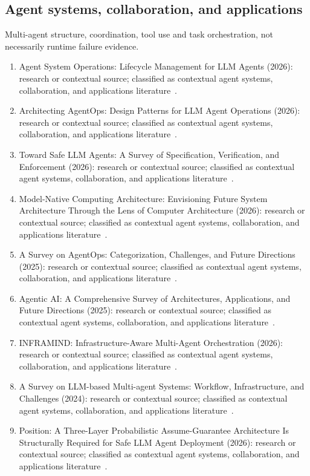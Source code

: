 \subsection{Agent systems, collaboration, and applications}
Multi-agent structure, coordination, tool use and task orchestration, not necessarily runtime failure evidence.
\begin{enumerate}
\setlength{\itemsep}{1pt}\setlength{\parskip}{0pt}
\footnotesize
\item Agent System Operations: Lifecycle Management for {LLM} Agents (2026): research or contextual source; classified as contextual agent systems, collaboration, and applications literature~\cite{ext012}.
\item Architecting {AgentOps}: Design Patterns for {LLM} Agent Operations (2026): research or contextual source; classified as contextual agent systems, collaboration, and applications literature~\cite{ext013}.
\item Toward Safe {LLM} Agents: A Survey of Specification, Verification, and Enforcement (2026): research or contextual source; classified as contextual agent systems, collaboration, and applications literature~\cite{ext017}.
\item Model-Native Computing Architecture: Envisioning Future System Architecture Through the Lens of Computer Architecture (2026): research or contextual source; classified as contextual agent systems, collaboration, and applications literature~\cite{ext032}.
\item A Survey on {AgentOps}: Categorization, Challenges, and Future Directions (2025): research or contextual source; classified as contextual agent systems, collaboration, and applications literature~\cite{ext034}.
\item Agentic {AI}: A Comprehensive Survey of Architectures, Applications, and Future Directions (2025): research or contextual source; classified as contextual agent systems, collaboration, and applications literature~\cite{ext035}.
\item {INFRAMIND}: Infrastructure-Aware Multi-Agent Orchestration (2026): research or contextual source; classified as contextual agent systems, collaboration, and applications literature~\cite{ext041}.
\item A Survey on {LLM}-based Multi-agent Systems: Workflow, Infrastructure, and Challenges (2024): research or contextual source; classified as contextual agent systems, collaboration, and applications literature~\cite{ext043}.
\item Position: A Three-Layer Probabilistic Assume-Guarantee Architecture Is Structurally Required for Safe {LLM} Agent Deployment (2026): research or contextual source; classified as contextual agent systems, collaboration, and applications literature~\cite{ext044}.

\end{enumerate}
